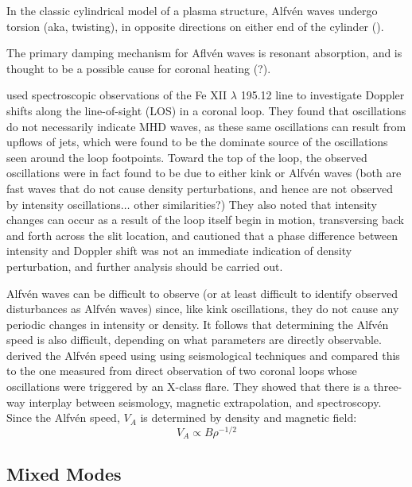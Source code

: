 \documentclass[preprint2]{aastex}
\begin{document}
In the classic cylindrical model of a plasma structure,
Alfv\'en waves undergo torsion (aka, twisting), in opposite directions on
either end of the cylinder (\cite{Nak}).

The primary damping mechanism for Aflv\'en waves is resonant absorption,
and is thought to be a possible cause for coronal heating (?).

\cite{tor_1} used spectroscopic observations of the Fe
{\footnotesize XII} $\lambda$ 195.12 line to investigate Doppler shifts
along the line-of-sight (LOS) in a coronal loop.
They found that oscillations do not necessarily indicate MHD waves,
as these same oscillations can result from upflows of jets, which were
found to be the dominate source of the oscillations seen around the loop
footpoints. Toward the top of the loop, the observed oscillations were
in fact found to be due to either kink or Alfv\'en waves
(both are fast waves that do not cause density perturbations, and
hence are not observed by intensity oscillations$\ldots$ other
similarities?) They also noted that intensity changes can occur as
a result of the loop itself begin in motion, transversing back and
forth across the slit location, and cautioned that a phase difference
between intensity and Doppler shift was not an immediate indication
of density perturbation, and further analysis should be carried out.

Alfv\'en waves can be difficult to observe (or at least difficult to
identify observed disturbances as Alfv\'en waves) since, like kink
oscillations, they do not cause any periodic changes in intensity or density.
It follows that determining the Alfv\'en speed is also difficult,
depending on what parameters are directly observable.
\cite{tor_2} derived the Alfv\'en speed using using seismological techniques
and compared this to the one measured from direct observation of two
coronal loops whose oscillations were triggered by an X-class flare.
They showed that there is a three-way interplay between seismology,
magnetic extrapolation, and spectroscopy. Since the Alfv\'en speed, $V_A$
is determined by density and magnetic field:
\begin{equation}
    V_A \propto B\rho^{-1/2}
\end{equation}

\subsection{Mixed Modes}
\end{document}
